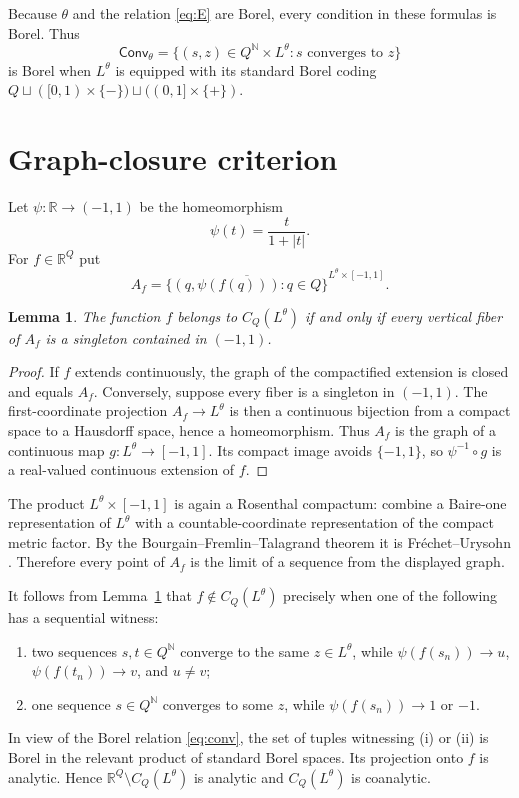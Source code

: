 \documentclass[11pt]{article}
\newtheorem{lemma}{Lemma}
\newcommand{\R}{\mathbb R}
\newcommand{\N}{\mathbb N}
\begin{document}
Because $\theta$ and the relation \eqref{eq:E} are Borel, every condition in these formulas is Borel.  Thus
\begin{equation}\label{eq:conv}
 \mathsf{Conv}_\theta=\{(s,z)\in Q^\N\times L^\theta:s\text{ converges to }z\}
\end{equation}
is Borel when $L^\theta$ is equipped with its standard Borel coding
$Q\sqcup([0,1)\times\{-\})\sqcup((0,1]\times\{+\})$.

\section*{Graph-closure criterion}
Let $\psi:\R\to(-1,1)$ be the homeomorphism
\[
 \psi(t)=\frac{t}{1+|t|}.
\]
For $f\in\R^Q$ put
\[
 A_f=\overline{\{(q,\psi(f(q))):q\in Q\}}^{L^\theta\times[-1,1]}.
\]

\begin{lemma}\label{lem:graph}
The function $f$ belongs to $C_Q(L^\theta)$ if and only if every vertical fiber of $A_f$ is a singleton contained in $(-1,1)$.
\end{lemma}

\begin{proof}
If $f$ extends continuously, the graph of the compactified extension is closed and equals $A_f$.  Conversely, suppose every fiber is a singleton in $(-1,1)$.  The first-coordinate projection $A_f\to L^\theta$ is then a continuous bijection from a compact space to a Hausdorff space, hence a homeomorphism.  Thus $A_f$ is the graph of a continuous map $g:L^\theta\to[-1,1]$.  Its compact image avoids $\{-1,1\}$, so $\psi^{-1}\circ g$ is a real-valued continuous extension of $f$.
\end{proof}

The product $L^\theta\times[-1,1]$ is again a Rosenthal compactum: combine a Baire-one representation of $L^\theta$ with a countable-coordinate representation of the compact metric factor.  By the Bourgain--Fremlin--Talagrand theorem it is Fr\'echet--Urysohn \cite{BFT}.  Therefore every point of $A_f$ is the limit of a sequence from the displayed graph.

It follows from Lemma~\ref{lem:graph} that $f\notin C_Q(L^\theta)$ precisely when one of the following has a sequential witness:
\begin{enumerate}[label=(\roman*),leftmargin=2em]
\item two sequences $s,t\in Q^\N$ converge to the same $z\in L^\theta$, while $\psi(f(s_n))\to u$, $\psi(f(t_n))\to v$, and $u\neq v$;
\item one sequence $s\in Q^\N$ converges to some $z$, while $\psi(f(s_n))\to1$ or $-1$.
\end{enumerate}
In view of the Borel relation \eqref{eq:conv}, the set of tuples witnessing (i) or (ii) is Borel in the relevant product of standard Borel spaces.  Its projection onto $f$ is analytic.  Hence $\R^Q\setminus C_Q(L^\theta)$ is analytic and $C_Q(L^\theta)$ is coanalytic.
\end{document}
